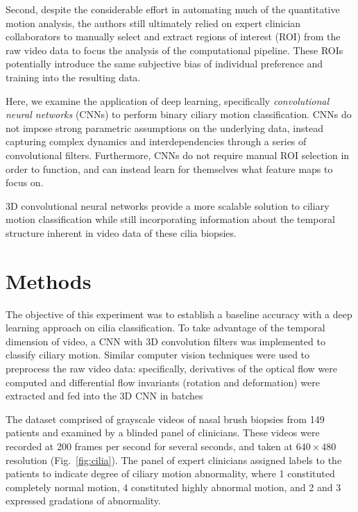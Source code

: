Second, despite the considerable effort in automating much of the quantitative motion analysis, the authors still ultimately relied on expert clinician collaborators to manually select and extract regions of interest (ROI) from the raw video data to focus the analysis of the computational pipeline. These ROIs potentially introduce the same subjective bias of individual preference and training into the resulting data.

Here, we examine the application of deep learning, specifically \textit{convolutional neural networks} (CNNs) to perform binary ciliary motion classification. CNNs do not impose strong parametric assumptions on the underlying data, instead capturing complex dynamics and interdependencies through a series of convolutional filters. Furthermore, CNNs do not require manual ROI selection in order to function, and can instead learn for themselves what feature maps to focus on.

3D convolutional neural networks provide a more scalable solution to ciliary motion classification while still incorporating information about the temporal structure inherent in video data of these cilia biopsies.

\section{Methods}

The objective of this experiment was to establish a baseline accuracy with a deep learning approach on cilia classification. To take advantage of the temporal dimension of video, a CNN with 3D convolution filters was implemented to classify ciliary motion. Similar computer vision techniques \cite{quinn2011novel} were used to preprocess the raw video data: specifically, derivatives of the optical flow were computed and differential flow invariants (rotation and deformation) were extracted and fed into the 3D CNN in batches

The dataset comprised of grayscale videos of nasal brush biopsies from 149 patients and examined by a blinded panel of clinicians. These videos were recorded at 200 frames per second for several seconds, and taken at $640 \times 480$ resolution (Fig.~\ref{fig:cilia}). The panel of expert clinicians assigned labels to the patients to indicate degree of ciliary motion abnormality, where 1 constituted completely normal motion, 4 constituted highly abnormal motion, and 2 and 3 expressed gradations of abnormality. 

